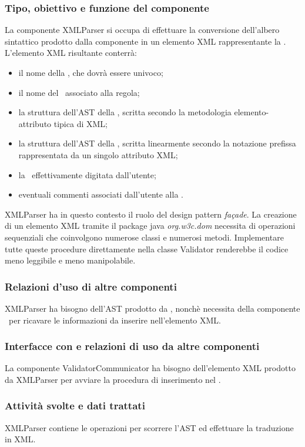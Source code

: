 \subsubsection{Tipo, obiettivo e funzione del componente}
La componente XMLParser si occupa di effettuare la conversione dell'albero sintattico prodotto dalla componente \brp in un elemento XML rappresentante la \br. L'elemento XML risultante conterr\`a:
\begin{itemize}
 \item il nome della \br, che dovr\`a essere univoco;
 \item il nome del \bo\ associato alla regola;
 \item la struttura dell'AST della \br, scritta secondo la metodologia elemento-attributo tipica di XML;
 \item la struttura dell'AST della \br, scritta linearmente secondo la notazione prefissa rappresentata da un singolo attributo XML;
 \item la \br\ effettivamente digitata dall'utente;
 \item eventuali commenti associati dall'utente alla \br.
\end{itemize}
XMLParser ha in questo contesto il ruolo del design pattern \textit{fa\c{c}ade}. La creazione di un elemento XML tramite il package java \textit{org.w3c.dom} necessita di operazioni sequenziali che coinvolgono numerose classi e numerosi metodi. Implementare tutte queste procedure direttamente nella classe Validator renderebbe il codice meno leggibile e meno manipolabile.
\subsubsection{Relazioni d'uso di altre componenti}
XMLParser ha bisogno dell'AST prodotto da \brp, nonch\`e necessita della componente \br\ per ricavare le informazioni da inserire nell'elemento XML.
\subsubsection{Interfacce con e relazioni di uso da altre componenti}
La componente ValidatorCommunicator ha bisogno dell'elemento XML prodotto da XMLParser per avviare la procedura di inserimento nel \rp.
\subsubsection{Attivit\`a svolte e dati trattati}
XMLParser contiene le operazioni per scorrere l'AST ed effettuare la traduzione in XML.

